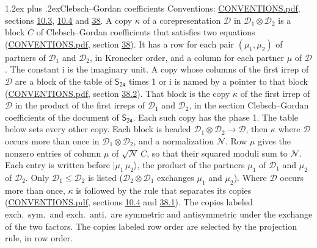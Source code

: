 \documentclass[10pt,a4paper]{article}
\makeatletter
\renewcommand\section{\@startsection{section}{1}{\z@}{-3ex plus -1ex minus -.2ex}%
  {1.2ex plus .2ex}{\normalfont\large\sffamily\bfseries\color{parttitle}}}
\numberwithin{equation}{section}
\newcommand{\grp}[1]{\mathsf{#1}}
\newcommand{\iunit}{\mathrm{i}}
\newcommand{\irrprod}{\otimes}
\newcommand{\mult}{\kappa}
\newcommand{\intx}{\mu}
\newcommand{\cgnorm}{\mathcal{N}}
\newcommand{\prodket}[2]{\lvert {#1}\,{#2}\rangle}
\makeatother
\begin{document}
\section{Clebsch--Gordan coefficients}\label{s:clebsch_gordan}
Conventions: \href{../../CONVENTIONS.pdf}{CONVENTIONS.pdf}, sections \href{../../../rotation/CONVENTIONS.pdf\#conv.10.3}{10.3}, \href{../../../rotation/CONVENTIONS.pdf\#conv.10.4}{10.4} and \href{../../CONVENTIONS.pdf\#conv.38}{38}.
\leavevmode\label{n:index.copy}\label{n:matrix.cg.stored}A copy $\mult$ of a corepresentation $\mathcal{D}$ in $\mathcal{D}_1\irrprod\mathcal{D}_2$ is a block $C$ of Clebsch--Gordan coefficients that satisfies two equations (\href{../../CONVENTIONS.pdf}{CONVENTIONS.pdf}, section \href{../../CONVENTIONS.pdf\#conv.38}{38}). \label{n:index.cg}It has a row for each pair $(\intx_1, \intx_2)$ of partners of $\mathcal{D}_1$ and $\mathcal{D}_2$, in Kronecker order, and a column for each partner $\intx$ of $\mathcal{D}$.
The constant $\iunit$ is the imaginary unit.
A copy whose columns of the first irrep of $\mathcal{D}$ are a block of the table of $\grp{S_{24}}$ times 1 or $\iunit$ is named by a pointer to that block (\href{../../CONVENTIONS.pdf}{CONVENTIONS.pdf}, section \href{../../CONVENTIONS.pdf\#conv.38.2}{38.2}). That block is the copy $\mult$ of the first irrep of $\mathcal{D}$ in the product of the first irreps of $\mathcal{D}_1$ and $\mathcal{D}_2$, in the section Clebsch--Gordan coefficients of the document of \href{../../../rotation/data/pdf/S24.pdf}{$\grp{S_{24}}$}. Each such copy has the phase 1. The table below sets every other copy.
Each block is headed $\mathcal{D}_1\irrprod\mathcal{D}_2\to\mathcal{D}$, then $\mult$ where $\mathcal{D}$ occurs more than once in $\mathcal{D}_1\irrprod\mathcal{D}_2$, and a normalization $\cgnorm$. Row $\intx$ gives the nonzero entries of column $\intx$ of $\sqrt{\cgnorm}\,C$, so that their squared moduli sum to $\cgnorm$. \label{n:vector.ket.product}Each entry is written before $\prodket{\intx_1}{\intx_2}$, the product of the partners $\intx_1$ of $\mathcal{D}_1$ and $\intx_2$ of $\mathcal{D}_2$. Only $\mathcal{D}_1 \le \mathcal{D}_2$ is listed ($\mathcal{D}_2\irrprod\mathcal{D}_1$ exchanges $\intx_1$ and $\intx_2$).
Where $\mathcal{D}$ occurs more than once, $\mult$ is followed by the rule that separates its copies (\href{../../CONVENTIONS.pdf}{CONVENTIONS.pdf}, sections \href{../../../rotation/CONVENTIONS.pdf\#conv.10.4}{10.4} and \href{../../CONVENTIONS.pdf\#conv.38.1}{38.1}). \label{n:abbreviation.exchange}The copies labeled exch.\ sym.\ and exch.\ anti.\ are symmetric and antisymmetric under the exchange of the two factors. The copies labeled row order are selected by the projection rule, in row order.
\end{document}
